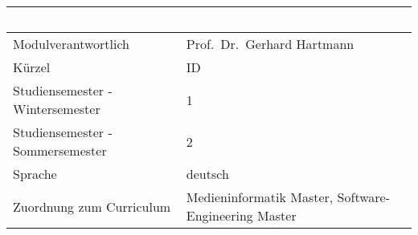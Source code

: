 \begin{longtable}[]{@{}ll@{}}
\toprule
\begin{minipage}[b]{0.12\columnwidth}\raggedright\strut
~\strut
\end{minipage} & \begin{minipage}[b]{0.12\columnwidth}\raggedright\strut
~\strut
\end{minipage}\tabularnewline
\midrule
\endhead
\begin{minipage}[t]{0.12\columnwidth}\raggedright\strut
Modulverantwortlich\strut
\end{minipage} & \begin{minipage}[t]{0.12\columnwidth}\raggedright\strut
Prof.~Dr.~Gerhard Hartmann\strut
\end{minipage}\tabularnewline
\begin{minipage}[t]{0.12\columnwidth}\raggedright\strut
Kürzel\strut
\end{minipage} & \begin{minipage}[t]{0.12\columnwidth}\raggedright\strut
ID\strut
\end{minipage}\tabularnewline
\begin{minipage}[t]{0.12\columnwidth}\raggedright\strut
Studiensemester - Wintersemester\strut
\end{minipage} & \begin{minipage}[t]{0.12\columnwidth}\raggedright\strut
1\strut
\end{minipage}\tabularnewline
\begin{minipage}[t]{0.12\columnwidth}\raggedright\strut
Studiensemester - Sommersemester\strut
\end{minipage} & \begin{minipage}[t]{0.12\columnwidth}\raggedright\strut
2\strut
\end{minipage}\tabularnewline
\begin{minipage}[t]{0.12\columnwidth}\raggedright\strut
Sprache\strut
\end{minipage} & \begin{minipage}[t]{0.12\columnwidth}\raggedright\strut
deutsch\strut
\end{minipage}\tabularnewline
\begin{minipage}[t]{0.12\columnwidth}\raggedright\strut
Zuordnung zum Curriculum\strut
\end{minipage} & \begin{minipage}[t]{0.12\columnwidth}\raggedright\strut
Medieninformatik Master, Software-Engineering Master\strut
\end{minipage}\tabularnewline

\end{longtable}

